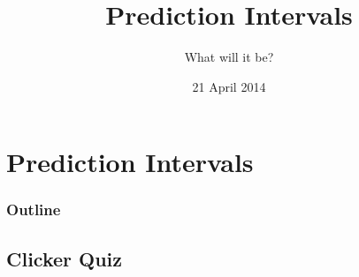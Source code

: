 
\section{Prediction Intervals}

\title{Prediction Intervals}
\subtitle{What will it be?}

\date{21 April 2014}

\begin{frame}
  \titlepage
\end{frame}

\begin{frame}
  \frametitle{Outline}
  \tableofcontents[hideothersubsections,sectionstyle=show/hide]
\end{frame}


\subsection{Clicker Quiz}


